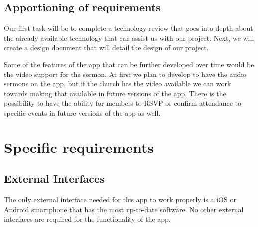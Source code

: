 \documentclass[letterpaper,10pt,draftclsnofoot,onecolumn,compsoc,titlepage]{IEEEtran}
\begin{document}
	\subsection{Apportioning of requirements}
	Our first task will be to complete a technology review that goes into depth about the already available technology that can assist us with our project. 
	Next, we will create a design document that will detail the design of our project. 
	
	Some of the features of the app that can be further developed over time would be the video support for the sermon. 
	At first we plan to develop to have the audio sermons on the app, but if the church has the video available we can work towards making that available in future versions of the app. 
	There is the possibility to have the ability for members to RSVP or confirm attendance to specific events in future versions of the app as well.
	

	\section{Specific requirements}
	\subsection{External Interfaces}
	The only external interface needed for this app to work properly is a iOS or Android smartphone that has the most up-to-date software.
	No other external interfaces are required for the functionality of the app.
\end{document}
